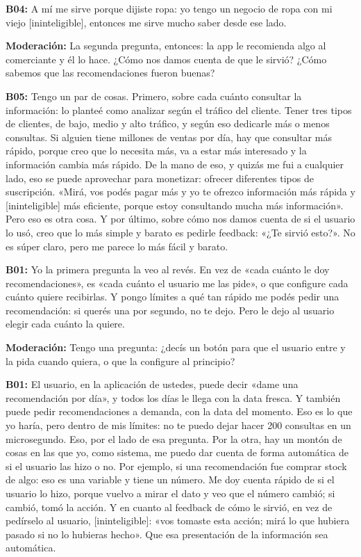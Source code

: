 \noindent\textbf{B04:} A mí me sirve porque dijiste ropa: yo tengo un negocio de ropa con mi viejo [ininteligible], entonces me sirve mucho saber desde ese lado.

\noindent\textbf{Moderación:} La segunda pregunta, entonces: la app le recomienda algo al comerciante y él lo hace. ¿Cómo nos damos cuenta de que le sirvió? ¿Cómo sabemos que las recomendaciones fueron buenas?

\noindent\textbf{B05:} Tengo un par de cosas. Primero, sobre cada cuánto consultar la información: lo planteé como analizar según el tráfico del cliente. Tener tres tipos de clientes, de bajo, medio y alto tráfico, y según eso dedicarle más o menos consultas. Si alguien tiene millones de ventas por día, hay que consultar más rápido, porque creo que lo necesita más, va a estar más interesado y la información cambia más rápido. De la mano de eso, y quizás me fui a cualquier lado, eso se puede aprovechar para monetizar: ofrecer diferentes tipos de suscripción. «Mirá, vos podés pagar más y yo te ofrezco información más rápida y [ininteligible] más eficiente, porque estoy consultando mucha más información». Pero eso es otra cosa. Y por último, sobre cómo nos damos cuenta de si el usuario lo usó, creo que lo más simple y barato es pedirle feedback: «¿Te sirvió esto?». No es súper claro, pero me parece lo más fácil y barato.

\noindent\textbf{B01:} Yo la primera pregunta la veo al revés. En vez de «cada cuánto le doy recomendaciones», es «cada cuánto el usuario me las pide», o que configure cada cuánto quiere recibirlas. Y pongo límites a qué tan rápido me podés pedir una recomendación: si querés una por segundo, no te dejo. Pero le dejo al usuario elegir cada cuánto la quiere.

\noindent\textbf{Moderación:} Tengo una pregunta: ¿decís un botón para que el usuario entre y la pida cuando quiera, o que la configure al principio?

\noindent\textbf{B01:} El usuario, en la aplicación de ustedes, puede decir «dame una recomendación por día», y todos los días le llega con la data fresca. Y también puede pedir recomendaciones a demanda, con la data del momento. Eso es lo que yo haría, pero dentro de mis límites: no te puedo dejar hacer 200 consultas en un microsegundo. Eso, por el lado de esa pregunta. Por la otra, hay un montón de cosas en las que yo, como sistema, me puedo dar cuenta de forma automática de si el usuario las hizo o no. Por ejemplo, si una recomendación fue comprar stock de algo: eso es una variable y tiene un número. Me doy cuenta rápido de si el usuario lo hizo, porque vuelvo a mirar el dato y veo que el número cambió; si cambió, tomó la acción. Y en cuanto al feedback de cómo le sirvió, en vez de pedírselo al usuario, [ininteligible]: «vos tomaste esta acción; mirá lo que hubiera pasado si no lo hubieras hecho». Que esa presentación de la información sea automática.


